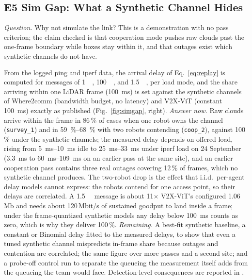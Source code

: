 \documentclass[journal]{IEEEtran}
\begin{document}


\subsection{E5 Sim Gap: What a Synthetic Channel Hides}
\emph{Question.} Why not simulate the link? This is a demonstration
with no pass criterion; the claim checked is that cooperation mode
pushes raw clouds past the one-frame boundary while boxes stay within
it, and that outages exist which synthetic channels do not have.

From the logged ping and iperf data, the arrival delay of
Eq.~\eqref{eq:replay} is computed for messages of \SI{1}{\kilo\byte},
\SI{100}{\kilo\byte}, and \SI{1.5}{\mega\byte}, per load mode, and
the share arriving within one LiDAR frame (\SI{100}{\milli\second}) is
set against the synthetic channels of Where2comm (bandwidth budget, no
latency) and V2X-ViT (constant \SI{100}{\milli\second}) exactly as
published (Fig.~\ref{fig:simgap}, right). \emph{Answer now.} Raw
clouds arrive within the frame in 86\,\% of cases when one robot owns
the channel (\texttt{survey\_1}) and in \SIrange{59}{68}{\percent}
with two robots contending (\texttt{coop\_2}), against 100\,\% under
the synthetic channels; the measured delay depends on offered load,
rising from \SIrange{5}{10}{\milli\second} idle to
\SIrange{25}{33}{\milli\second} under iperf load on 24 September
(\SI{3.3}{\milli\second} to \SIrange{60}{109}{\milli\second} on an
earlier pass at the same site), and an earlier cooperation pass
contains three real outages covering 12\,\% of frames, which no
synthetic channel produces. The
two-robot drop is the effect that i.i.d.\ per-agent delay models
cannot express: the robots contend for one access point, so their
delays are correlated. A \SI{1.5}{\mega\byte} message is about
11$\times$ V2X-ViT's configured 1.06\,Mb and needs about
120\,Mbit/s of sustained goodput to land inside a frame; under the
frame-quantized synthetic models any delay below
\SI{100}{\milli\second} counts as zero, which is why they deliver
100\,\%. \emph{Remaining.} A best-fit synthetic baseline, a constant
or Binomial delay fitted to the measured delays, to show that even a
tuned synthetic channel mispredicts in-frame share because outages and
contention are correlated; the same figure over more passes and a
second site; and a probe-off control run to separate the queueing the
measurement itself adds from the queueing the team would face.
Detection-level consequences are reported in \cite{scoop_dataset}.
\end{document}
